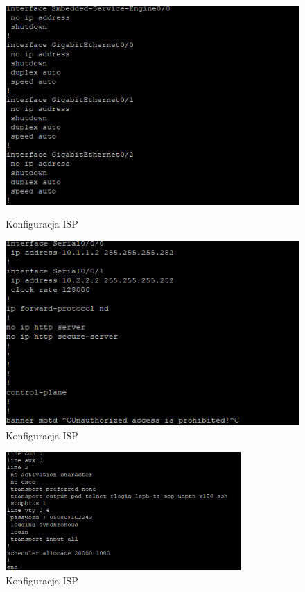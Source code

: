 \documentclass[12pt,twoside,a4paper,openany]{article}
\begin{document}
\begin{figure}[h]
    \centering
    \begin{minipage}{0.49\textwidth}
        \centering
        \includegraphics[width=\textwidth]{Kaleta part 2/ISP/3.png}
        \caption{Konfiguracja ISP}
        \label{fig:ISP-3}
    \end{minipage}
    \hfill
    \begin{minipage}{0.49\textwidth}
        \centering
        \includegraphics[width=\textwidth]{Kaleta part 2/ISP/4.png}
        \caption{Konfiguracja ISP}
        \label{fig:ISP-4}
    \end{minipage}
\end{figure}

\begin{figure}[h]
    \centering
    \includegraphics[width=0.8\textwidth]{Kaleta part 2/ISP/5.png}
    \caption{Konfiguracja ISP}
    \label{fig:ISP-5}
\end{figure}
\end{document}

